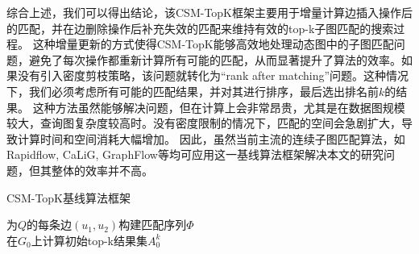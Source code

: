 综合上述，我们可以得出结论，该CSM-TopK框架主要用于增量计算边插入操作后的匹配，并在边删除操作后补充失效的匹配来维持有效的top-k子图匹配的搜索过程。
这种增量更新的方式使得CSM-TopK能够高效地处理动态图中的子图匹配问题，避免了每次操作都重新计算所有可能的匹配，从而显著提升了算法的效率。如果没有引入密度剪枝策略，该问题就转化为“rank after matching”问题。这种情况下，我们必须考虑所有可能的匹配结果，并对其进行排序，最后选出排名前$k$的结果。
这种方法虽然能够解决问题，但在计算上会非常昂贵，尤其是在数据图规模较大，查询图复杂度较高时。没有密度限制的情况下，匹配的空间会急剧扩大，导致计算时间和空间消耗大幅增加。
因此，虽然当前主流的连续子图匹配算法，如Rapidflow\cite{csm-rapidflow-DBLP:journals/pvldb/SunSHL22}, CaLiG\cite{csm-calig-DBLP:journals/pacmmod/YangZZY23}, GraphFlow\cite{csm-graphflow-DBLP:conf/sigmod/KankanamgeSMCS17}等均可应用这一基线算法框架解决本文的研究问题，但其整体的效率并不高。
\begin{algorithm}[h!]
    \small
    \caption{\label{alg:baseline:framework}CSM-TopK基线算法框架}
        为$Q$的每条边$(u_1, u_2)$构建匹配序列$\Phi$ \label{code:build-matching-order} \\
        在$G_0$上计算初始top-k结果集$A_0^k$ \label{code:build-initial-topk}\\
    \Return
    \end{algorithm}

